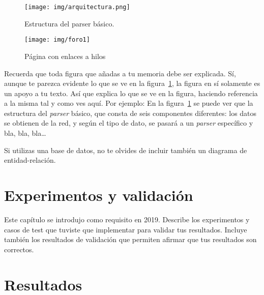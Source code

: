 \documentclass[a4paper, 12pt]{book}
\begin{document}
\begin{figure}
  \centering
  \texttt{[image: img/arquitectura.png]}
  \caption{Estructura del parser básico.}\label{fig:arquitectura}
\end{figure}

\begin{figure}
    \centering
    \texttt{[image: img/foro1]}
    \caption{Página con enlaces a hilos}\label{fig:_arquitectura}
\end{figure}

 
Recuerda que toda figura que añadas a tu memoria debe ser explicada.
Sí, aunque te parezca evidente lo que se ve en la figura~\ref{fig:arquitectura}, la figura en sí solamente es un apoyo a tu texto.
Así que explica lo que se ve en la figura, haciendo referencia a la misma tal y como ves aquí.
Por ejemplo: En la figura~\ref{fig:arquitectura} se puede ver que la estructura del \emph{parser} básico, que consta de seis componentes diferentes: los datos se obtienen de la red, y según el tipo de dato, se pasará a un \emph{parser} específico y bla, bla, bla\ldots

Si utilizas una base de datos, no te olvides de incluir también un diagrama de entidad-relación.



\cleardoublepage
\chapter{Experimentos y validación}

Este capítulo se introdujo como requisito en 2019. 
Describe los experimentos y casos de test que tuviste que implementar para validar tus resultados. 
Incluye también los resultados de validación que permiten afirmar que tus resultados son correctos. 



\cleardoublepage
\chapter{Resultados}
\end{document}
